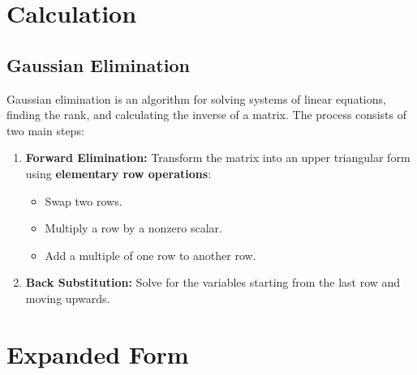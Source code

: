 \documentclass{article}
\begin{document}
\newpage
\section{Calculation}

\subsection{Gaussian Elimination}
\label{subsec:gauss}

Gaussian elimination is an algorithm for solving systems of linear equations, finding the rank, and calculating the inverse of a matrix. The process consists of two main steps:

\begin{enumerate}
    \item \textbf{Forward Elimination:} Transform the matrix into an upper triangular form using \textbf{elementary row operations}:
    \begin{itemize}
        \item Swap two rows.
        \item Multiply a row by a nonzero scalar.
        \item Add a multiple of one row to another row.
    \end{itemize}
    \item \textbf{Back Substitution:} Solve for the variables starting from the last row and moving upwards.
\end{enumerate}


\newpage
\appendix
\section{Expanded Form}
\end{document}
